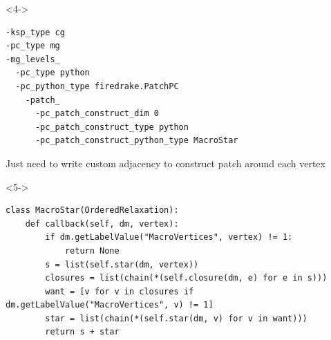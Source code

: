 \documentclass[presentation,aspectratio=43, 10pt]{beamer}
\begin{document}
\begin{frame}[fragile]
\begin{onlyenv}
\begin{center}
    \end{center}
  \end{onlyenv}
  \begin{onlyenv}<4->
    {\scriptsize
\begin{verbatim}
-ksp_type cg
-pc_type mg
-mg_levels_
  -pc_type python
  -pc_python_type firedrake.PatchPC
    -patch_
      -pc_patch_construct_dim 0
      -pc_patch_construct_type python
      -pc_patch_construct_python_type MacroStar
\end{verbatim}
    }
    Just need to write custom adjacency to construct patch around each vertex
    \begin{uncoverenv}<5->
\begin{verbatim}
class MacroStar(OrderedRelaxation):
    def callback(self, dm, vertex):
        if dm.getLabelValue("MacroVertices", vertex) != 1:
            return None
        s = list(self.star(dm, vertex))
        closures = list(chain(*(self.closure(dm, e) for e in s)))
        want = [v for v in closures if dm.getLabelValue("MacroVertices", v) != 1]
        star = list(chain(*(self.star(dm, v) for v in want)))
        return s + star
\end{verbatim}
    \end{uncoverenv}
  \end{onlyenv}
\end{frame}
\end{document}
